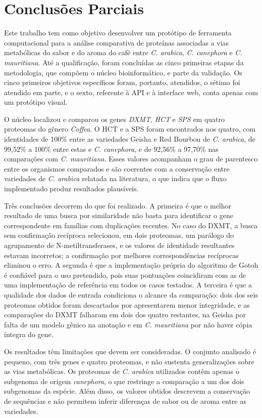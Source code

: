 \chapter{Conclusões Parciais}
\label{cap:05}

Este trabalho tem como objetivo desenvolver um protótipo de ferramenta computacional para a análise comparativa de proteínas associadas a vias metabólicas do sabor e do aroma do café entre \textit{C. arabica}, \textit{C. canephora} e \textit{C. mauritiana}. Até a qualificação, foram concluídas as cinco primeiras etapas da metodologia, que compõem o núcleo bioinformático, e parte da validação. Os cinco primeiros objetivos específicos foram, portanto, atendidos, o sétimo foi atendido em parte, e o sexto, referente à API e à interface web, conta apenas com um protótipo visual.

O núcleo localizou e comparou os genes \textit{DXMT}, \textit{HCT} e \textit{SPS} em quatro proteomas do gênero \textit{Coffea}. O HCT e a SPS foram encontrados nos quatro, com identidades de 100\% entre as variedades Geisha e Red Bourbon de \textit{C. arabica}, de 99,52\% a 100\% entre estas e \textit{C. canephora}, e de 92,56\% a 97,70\% nas comparações com \textit{C. mauritiana}. Esses valores acompanham o grau de parentesco entre os organismos comparados e são coerentes com a conservação entre variedades de \textit{C. arabica} relatada na literatura, o que indica que o fluxo implementado produz resultados plausíveis.

Três conclusões decorrem do que foi realizado. A primeira é que o melhor resultado de uma busca por similaridade não basta para identificar o gene correspondente em famílias com duplicações recentes. No caso do DXMT, a busca sem confirmação recíproca selecionou, em dois proteomas, um parálogo do agrupamento de N-metiltransferases, e os valores de identidade resultantes estavam incorretos; a confirmação por melhores correspondências recíprocas eliminou o erro. A segunda é que a implementação própria do algoritmo de Gotoh é confiável para o uso pretendido, pois suas pontuações coincidiram com as de uma implementação de referência em todos os casos testados. A terceira é que a qualidade dos dados de entrada condiciona o alcance da comparação: dois dos seis proteomas obtidos foram descartados por apresentarem menor integridade, e as comparações do DXMT falharam em dois dos quatro restantes, na Geisha por falta de um modelo gênico na anotação e em \textit{C. mauritiana} por não haver cópia íntegra do gene.

Os resultados têm limitações que devem ser consideradas. O conjunto analisado é pequeno, com três genes e quatro proteomas, e não sustenta generalizações sobre as vias metabólicas. Os proteomas de \textit{C. arabica} utilizados contêm apenas o subgenoma de origem \textit{canephora}, o que restringe a comparação a um dos dois subgenomas da espécie. Além disso, os valores obtidos descrevem a conservação de sequências e não permitem inferir diferenças de sabor ou de aroma entre as variedades.

